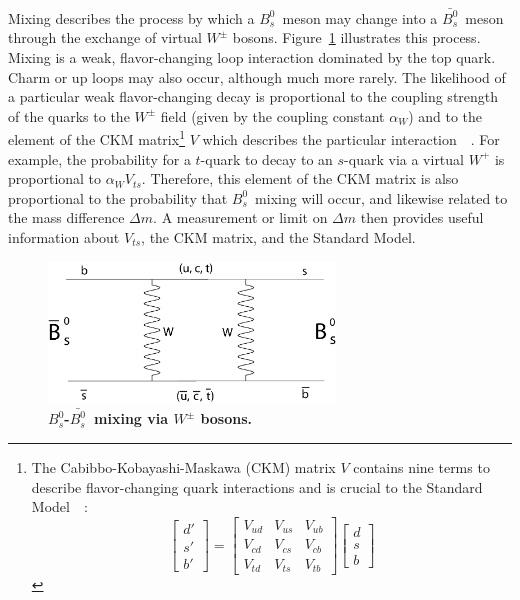 \documentclass[10pt]{article}
\newcommand{\Bs}{\mbox{$B_{s}^{0}$}}
\newcommand{\Bsbar}{\mbox{$\bar{B_{s}^{0}}$}}
\begin{document}
\noindent Mixing describes the process by which a \Bs\ meson may
change into a \Bsbar\ meson through the exchange of virtual
$W^\pm$ bosons. Figure~\ref{mixdiagram} illustrates this process.
Mixing is a weak, flavor-changing loop interaction dominated by
the top quark.  Charm or up loops may also occur, although much
more rarely.  The likelihood of a particular weak flavor-changing
decay is proportional to the coupling strength of the quarks to
the $W^\pm$ field (given by the coupling constant $\alpha_W$) and
to the element of the CKM matrix\footnote{The
Cabibbo-Kobayashi-Maskawa (CKM) matrix $V$ contains nine terms to
describe flavor-changing quark interactions and is crucial to the
Standard Model~\cite{griffiths}~\cite{PDG}:
\begin{displaymath}
    \begin{bmatrix}d'\\s'\\b'\end{bmatrix} =
    \begin{bmatrix}V_{ud}&V_{us}&V_{ub}\\V_{cd}&V_{cs}&V_{cb}\\V_{td}&V_{ts}&V_{tb}\end{bmatrix}
    \begin{bmatrix}d\\s\\b\end{bmatrix}
\end{displaymath}} $V$ which describes the
particular interaction~\cite{griffiths}~\cite{PDG}. For example, the probability for a
$t$-quark to decay to an $s$-quark via a virtual $W^+$ is
proportional to $\alpha_{W} V_{ts}$. Therefore, this element of
the CKM matrix is also proportional to the probability that \Bs\
mixing will occur, and likewise related to the mass difference
$\Delta m$.  A measurement or limit on $\Delta m$ then provides
useful information about $V_{ts}$, the CKM matrix, and the Standard Model.\\

\begin{figure}
\begin{center}
\includegraphics[width=3in]{Bs-Mixing-Diagram.eps}
\caption{\bf \Bs -\Bsbar\ mixing via $W^\pm$ bosons.} \label{mixdiagram}
\end{center}
\end{figure}
\end{document}
